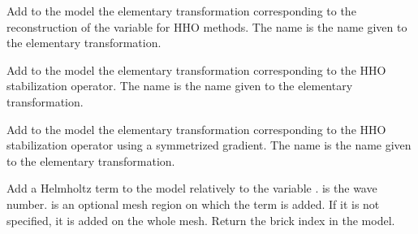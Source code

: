 \documentclass[a4paper,11pt,english]{sphinxmanual}
\begin{document}
\begin{fulllineitems}
\begin{fulllineitems}
\label{\detokenize{python/cmdref_Model:getfem.Model.add_HHO_reconstructed_value}}
Add to the model the elementary transformation corresponding to the
reconstruction of the variable for HHO methods.
The name is the name given to the elementary transformation.

\end{fulllineitems}


\begin{fulllineitems}
\label{\detokenize{python/cmdref_Model:getfem.Model.add_HHO_stabilization}}
Add to the model the elementary transformation corresponding to the
HHO stabilization operator.
The name is the name given to the elementary transformation.

\end{fulllineitems}


\begin{fulllineitems}
\label{\detokenize{python/cmdref_Model:getfem.Model.add_HHO_symmetrized_stabilization}}
Add to the model the elementary transformation corresponding to the
HHO stabilization operator using a symmetrized gradient.
The name is the name given to the elementary transformation.

\end{fulllineitems}


\begin{fulllineitems}
\label{\detokenize{python/cmdref_Model:getfem.Model.add_Helmholtz_brick}}
Add a Helmholtz term to the model relatively to the variable .
 is the wave number.  is an optional mesh
region on which the term is added. If it is not specified, it is added
on the whole mesh. Return the brick index in the model.


\end{fulllineitems}
\end{fulllineitems}
\end{document}

